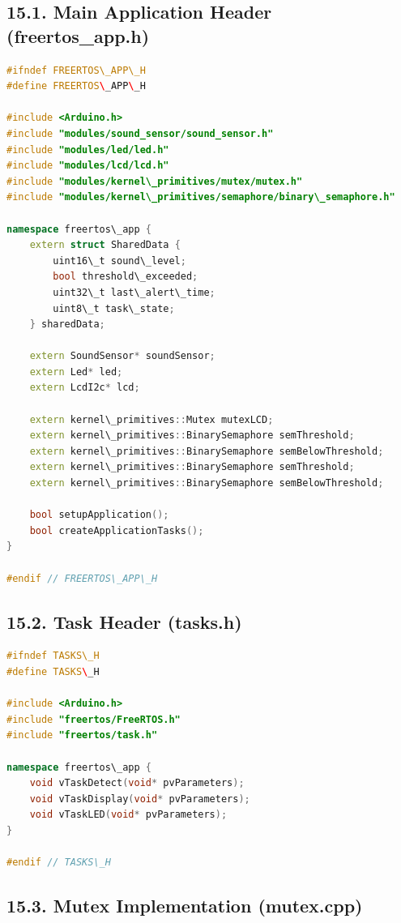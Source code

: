 \documentclass[12pt]{article}
\begin{document}
\subsection*{15.1. Main Application Header (freertos\_app.h)}

\begin{lstlisting}[language=C++, caption=freertos\_app.h - Application Interface]
#ifndef FREERTOS\_APP\_H
#define FREERTOS\_APP\_H

#include <Arduino.h>
#include "modules/sound_sensor/sound_sensor.h"
#include "modules/led/led.h"
#include "modules/lcd/lcd.h"
#include "modules/kernel\_primitives/mutex/mutex.h"
#include "modules/kernel\_primitives/semaphore/binary\_semaphore.h"

namespace freertos\_app {
    extern struct SharedData {
        uint16\_t sound\_level;
        bool threshold\_exceeded;
        uint32\_t last\_alert\_time;
        uint8\_t task\_state;
    } sharedData;
    
    extern SoundSensor* soundSensor;
    extern Led* led;
    extern LcdI2c* lcd;
    
    extern kernel\_primitives::Mutex mutexLCD;
    extern kernel\_primitives::BinarySemaphore semThreshold;
    extern kernel\_primitives::BinarySemaphore semBelowThreshold;
    extern kernel\_primitives::BinarySemaphore semThreshold;
    extern kernel\_primitives::BinarySemaphore semBelowThreshold;
    
    bool setupApplication();
    bool createApplicationTasks();
}

#endif // FREERTOS\_APP\_H
\end{lstlisting}

\subsection*{15.2. Task Header (tasks.h)}

\begin{lstlisting}[language=C++, caption=tasks.h - Task Interface]
#ifndef TASKS\_H
#define TASKS\_H

#include <Arduino.h>
#include "freertos/FreeRTOS.h"
#include "freertos/task.h"

namespace freertos\_app {
    void vTaskDetect(void* pvParameters);
    void vTaskDisplay(void* pvParameters);
    void vTaskLED(void* pvParameters);
}

#endif // TASKS\_H
\end{lstlisting}

\subsection*{15.3. Mutex Implementation (mutex.cpp)}
\end{document}
